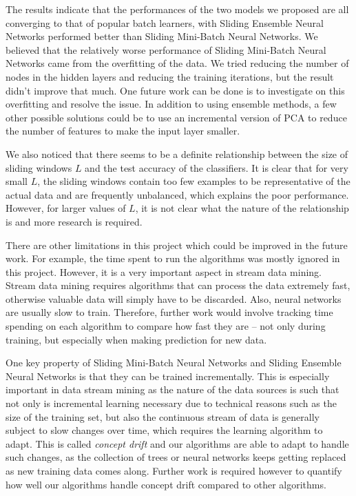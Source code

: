 \documentclass[conference]{IEEEtran}
\begin{document}
		The results indicate that the performances of the two models we proposed are all converging to that of popular batch learners, with Sliding Ensemble Neural Networks performed better than Sliding Mini-Batch Neural Networks. We believed that the relatively worse performance of  Sliding Mini-Batch Neural Networks came from the overfitting of the data. We tried reducing the number of nodes in the hidden layers and reducing the training iterations, but the result didn't improve that much. One future work can be done is to investigate on this overfitting and resolve the issue. In addition to using ensemble methods, a few other possible solutions could be to use an incremental version of PCA to reduce the number of features to make the input layer smaller.
		
		We also noticed that there seems to be a definite relationship between the size of sliding windows $L$ and the test accuracy of the classifiers. It is clear that for very small $L$, the sliding windows contain too few examples to be representative of the actual data and are frequently unbalanced, which explains the poor performance. However, for larger values of $L$, it is not clear what the nature of the relationship is and more research is required.
		
		There are other limitations in this project which could be improved in the future work. For example, the time spent to run the algorithms was mostly ignored in this project. However, it is a very important aspect in stream data mining. Stream data mining requires algorithms that can process the data extremely fast, otherwise valuable data will simply have to be discarded. Also, neural networks are usually slow to train. Therefore, further work would involve tracking time spending on each algorithm to compare how fast they are -- not only during training, but especially when making prediction for new data.
		
		
		One key property of   Sliding Mini-Batch Neural Networks and Sliding Ensemble Neural Networks is that they can be trained incrementally. This is especially important in data stream mining as the nature of the data sources is such that not only is incremental learning necessary due to technical reasons such as the size of the training set, but also the continuous stream of data is generally subject to slow changes over time, which requires the learning algorithm to adapt. This is called \emph{concept drift} and our algorithms are able to adapt to handle such changes, as the collection of trees or neural networks keeps getting replaced as new training data comes along. Further work is required however to quantify how well our algorithms handle concept drift compared to other algorithms.
		
\end{document}
